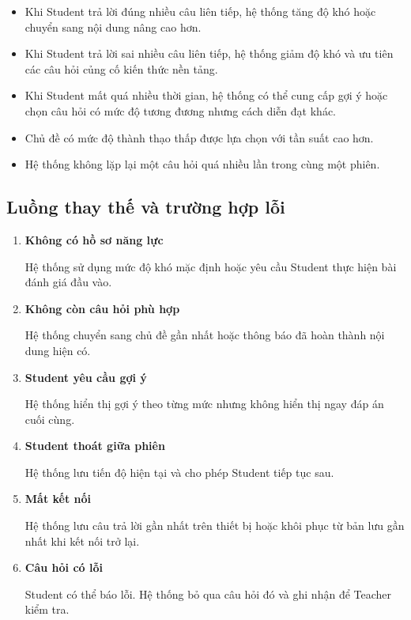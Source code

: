 \begin{itemize}
	\item Khi Student trả lời đúng nhiều câu liên tiếp, hệ thống tăng độ
	khó hoặc chuyển sang nội dung nâng cao hơn.
	
	\item Khi Student trả lời sai nhiều câu liên tiếp, hệ thống giảm độ
	khó và ưu tiên các câu hỏi củng cố kiến thức nền tảng.
	
	\item Khi Student mất quá nhiều thời gian, hệ thống có thể cung cấp
	gợi ý hoặc chọn câu hỏi có mức độ tương đương nhưng cách diễn đạt
	khác.
	
	\item Chủ đề có mức độ thành thạo thấp được lựa chọn với tần suất cao
	hơn.
	
	\item Hệ thống không lặp lại một câu hỏi quá nhiều lần trong cùng một
	phiên.
\end{itemize}

\subsection{Luồng thay thế và trường hợp lỗi}

\begin{enumerate}[label=\textbf{A\arabic*.}]
	\item \textbf{Không có hồ sơ năng lực}
	
	Hệ thống sử dụng mức độ khó mặc định hoặc yêu cầu Student thực hiện
	bài đánh giá đầu vào.
	
	\item \textbf{Không còn câu hỏi phù hợp}
	
	Hệ thống chuyển sang chủ đề gần nhất hoặc thông báo đã hoàn thành nội
	dung hiện có.
	
	\item \textbf{Student yêu cầu gợi ý}
	
	Hệ thống hiển thị gợi ý theo từng mức nhưng không hiển thị ngay đáp
	án cuối cùng.
	
	\item \textbf{Student thoát giữa phiên}
	
	Hệ thống lưu tiến độ hiện tại và cho phép Student tiếp tục sau.
	
	\item \textbf{Mất kết nối}
	
	Hệ thống lưu câu trả lời gần nhất trên thiết bị hoặc khôi phục từ bản
	lưu gần nhất khi kết nối trở lại.
	
	\item \textbf{Câu hỏi có lỗi}
	
	Student có thể báo lỗi. Hệ thống bỏ qua câu hỏi đó và ghi nhận để
	Teacher kiểm tra.
\end{enumerate}

